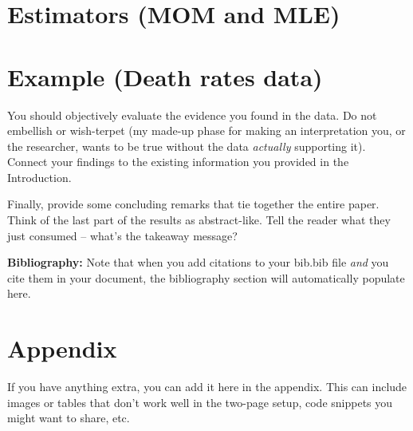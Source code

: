 \documentclass{article}\usepackage[]{graphicx}\usepackage[]{xcolor}
\begin{document}
\begin{multicols}{2}
\section{Estimators (MOM and MLE)}


\section{Example (Death rates data)}


 You should objectively evaluate the evidence you found in the data. Do not embellish or wish-terpet (my made-up phase for making an interpretation you, or the researcher, wants to be true without the data \emph{actually} supporting it). Connect your findings to the existing information you provided in the Introduction.

Finally, provide some concluding remarks that tie together the entire paper. Think of the last part of the results as abstract-like. Tell the reader what they just consumed -- what's the takeaway message?

\vspace{2em}

\noindent\textbf{Bibliography:} Note that when you add citations to your bib.bib file \emph{and}
you cite them in your document, the bibliography section will automatically populate here.

\begin{tiny}

\end{tiny}
\end{multicols}

\newpage
\onecolumn
\section{Appendix}

If you have anything extra, you can add it here in the appendix. This can include images or tables that don't work well in the two-page setup, code snippets you might want to share, etc.
\end{document}
